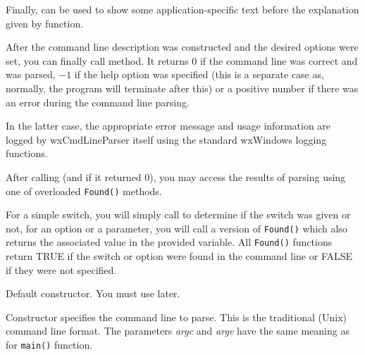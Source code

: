 Finally,  can be used to show some
application-specific text before the explanation given by 
 function.

\label{wxcmdlineparserparsing}

After the command line description was constructed and the desired options were
set, you can finally call  method.
It returns $0$ if the command line was correct and was parsed, $-1$ if the help
option was specified (this is a separate case as, normally, the program will
terminate after this) or a positive number if there was an error during the
command line parsing.

In the latter case, the appropriate error message and usage information are
logged by wxCmdLineParser itself using the standard wxWindows logging functions.

\label{wxcmdlineparsergettingresults}

After calling  (and if it returned $0$),
you may access the results of parsing using one of overloaded {\tt Found()}
methods.

For a simple switch, you will simply call 
 to determine if the switch was given
or not, for an option or a parameter, you will call a version of {\tt Found()} 
which also returns the associated value in the provided variable. All 
{\tt Found()} functions return TRUE if the switch or option were found in the
command line or FALSE if they were not specified.


\label{wxcmdlineparserwxcmdlineparserdef}


Default constructor. You must use 
 later.

\label{wxcmdlineparserwxcmdlineparserargc}


Constructor specifies the command line to parse. This is the traditional
(Unix) command line format. The parameters {\it argc} and {\it argv} have the
same meaning as for {\tt main()} function.

